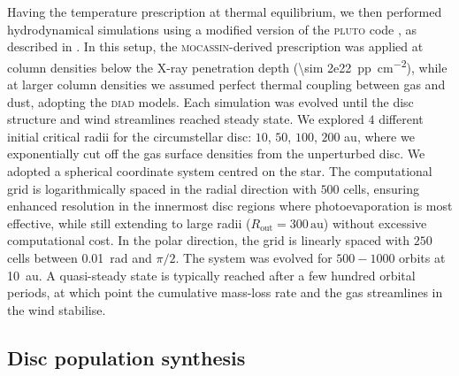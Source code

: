 \documentclass[letters,fleqn,usenatbib]{mnras}
\begin{document}
Having the temperature prescription at thermal equilibrium, we then performed hydrodynamical simulations using a modified version of the \textsc{pluto} code \citep{2007ApJS..170..228M}, as described in \citet{2019MNRAS.487..691P}.
In this setup, the \textsc{mocassin}-derived prescription was applied at column densities below the X-ray penetration depth (\SI{\sim 2e22}{pp.cm^{-2}}), while at larger column densities we assumed perfect thermal coupling between gas and dust, adopting the \textsc{diad} models.
Each simulation was evolved until the disc structure and wind streamlines reached steady state.
We explored $4$ different initial critical radii for the circumstellar disc: $10$, $50$, $100$, $200$ au, where we exponentially cut off the gas surface densities from the unperturbed disc.
We adopted a spherical coordinate system centred on the star.
The computational grid is logarithmically spaced in the radial direction with $500$ cells, ensuring enhanced resolution in the innermost disc regions where photoevaporation is most effective, while still extending to large radii ($R_\mathrm{out} = 300\,\mathrm{au}$) without excessive computational cost. In the polar direction, the grid is linearly spaced with $250$ cells between \SI{0.01}{rad} and $\pi/2$.
The system was evolved for $500-1000$ orbits at \SI{10}{au}.
A quasi-steady state is typically reached after a few hundred orbital periods, at which point the cumulative mass-loss rate and the gas streamlines in the wind stabilise.

\subsection{Disc population synthesis}
\end{document}
